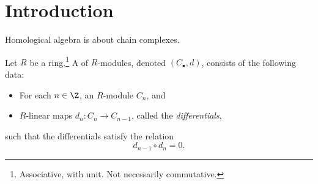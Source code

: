 \documentclass[main.tex]{subfiles}
\begin{document}
\chapter{Introduction}
\label{ch:introduction}

Homological algebra is about chain complexes.
\begin{definition}
  \label{def:chain_complex}
  Let $R$ be a ring.\footnote{Associative, with unit. Not necessarily commutative.} A  of $R$-modules, denoted $(C_{\bullet}, d)$, consists of the following data:
  \begin{itemize}
    \item For each $n \in \Z$, an $R$-module $C_{n}$, and

    \item $R$-linear maps $d_{n}\colon C_{n} \to C_{n-1}$, called the \emph{differentials},
  \end{itemize}
  such that the differentials satisfy the relation
  \begin{equation*}
    d_{n-1} \circ d_{n} = 0.
  \end{equation*}
\end{definition}

%
%
\end{document}
